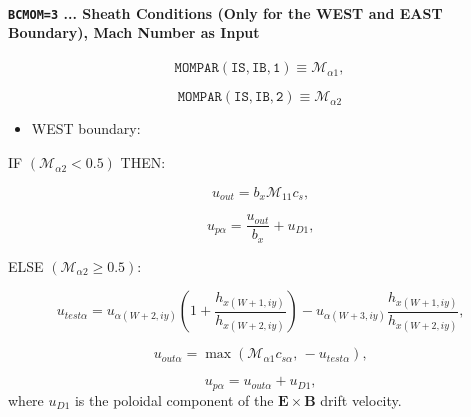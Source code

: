 \documentclass[11pt]{article}
\begin{document}
\bigskip

\paragraph{\texttt{BCMOM=3} ... Sheath Conditions (Only for the WEST and
EAST Boundary), Mach Number as Input}

\bigskip

\begin{equation*}
\mathtt{MOMPAR(IS,IB,1)}\equiv\mathcal{M}_{\alpha1}, 
\end{equation*}

\begin{equation*}
\mathtt{MOMPAR(IS,IB,2)}\equiv\mathcal{M}_{\alpha2}
\end{equation*}

\bigskip

\begin{itemize}
\item  WEST boundary:
\end{itemize}

\bigskip

IF $\left( \mathcal{M}_{\alpha2}<0.5\right) $ THEN:

\begin{equation}
u_{out}=b_{x}\mathcal{M}_{11}c_{s}\text{,}   \label{c107}
\end{equation}

\begin{equation}
u_{p\alpha}=\frac{u_{out}}{b_{x}}+u_{D1}\text{,}   \label{c108}
\end{equation}

\bigskip

ELSE $\left( \mathcal{M}_{\alpha2}\geq0.5\right) $:

\begin{equation}
u_{test\alpha}=u_{\alpha\left( W+2,iy\right) }\left( 1+\frac{h_{x\left(
W+1,iy\right) }}{h_{x\left( W+2,iy\right) }}\right) -u_{\alpha\left(
W+3,iy\right) }\frac{h_{x\left( W+1,iy\right) }}{h_{x\left( W+2,iy\right) }}%
\text{,}   \label{c109}
\end{equation}

\begin{equation}
u_{out\alpha}=\max\left( \mathcal{M}_{\alpha1}c_{s\alpha}\text{, }%
-u_{test\alpha}\right) \text{,}   \label{c110}
\end{equation}

\begin{equation}
u_{p\alpha}=u_{out\alpha}+u_{D1}\text{,}   \label{c111}
\end{equation}
where $u_{D1}$ is the poloidal component of the $\mathbf{E\times B}$ drift
velocity.
\end{document}
